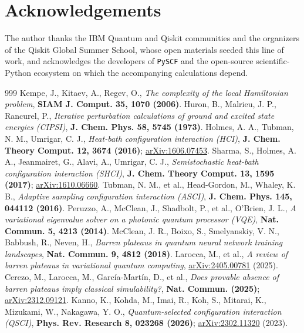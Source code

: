 \documentclass[11pt]{article}
\begin{document}
\section*{Acknowledgements}
\small
The author thanks the IBM Quantum and Qiskit communities and the organizers of the Qiskit Global Summer School,
whose open materials seeded this line of work, and acknowledges the developers of \texttt{PySCF} and the
open-source scientific-Python ecosystem on which the accompanying calculations depend.


\begingroup
\footnotesize
\frenchspacing
\begin{thebibliography}{999}
\setlength{\itemsep}{1.5pt}\setlength{\parsep}{0pt}
 Kempe, J., Kitaev, A., Regev, O., \emph{The complexity of the local Hamiltonian problem}, \textbf{SIAM J. Comput. 35, 1070 (2006)}.
 Huron, B., Malrieu, J. P., Rancurel, P., \emph{Iterative perturbation calculations of ground and excited state energies (CIPSI)}, \textbf{J. Chem. Phys. 58, 5745 (1973)}.
 Holmes, A. A., Tubman, N. M., Umrigar, C. J., \emph{Heat-bath configuration interaction (HCI)}, \textbf{J. Chem. Theory Comput. 12, 3674 (2016)}; \href{https://arxiv.org/abs/1606.07453}{arXiv:1606.07453}.
 Sharma, S., Holmes, A. A., Jeanmairet, G., Alavi, A., Umrigar, C. J., \emph{Semistochastic heat-bath configuration interaction (SHCI)}, \textbf{J. Chem. Theory Comput. 13, 1595 (2017)}; \href{https://arxiv.org/abs/1610.06660}{arXiv:1610.06660}.
 Tubman, N. M., et al., Head-Gordon, M., Whaley, K. B., \emph{Adaptive sampling configuration interaction (ASCI)}, \textbf{J. Chem. Phys. 145, 044112 (2016)}.
 Peruzzo, A., McClean, J., Shadbolt, P., et al., O'Brien, J. L., \emph{A variational eigenvalue solver on a photonic quantum processor (VQE)}, \textbf{Nat. Commun. 5, 4213 (2014)}.
 McClean, J. R., Boixo, S., Smelyanskiy, V. N., Babbush, R., Neven, H., \emph{Barren plateaus in quantum neural network training landscapes}, \textbf{Nat. Commun. 9, 4812 (2018)}.
 Larocca, M., et al., \emph{A review of barren plateaus in variational quantum computing}, \href{https://arxiv.org/abs/2405.00781}{arXiv:2405.00781} (2025).
 Cerezo, M., Larocca, M., García-Martín, D., et al., \emph{Does provable absence of barren plateaus imply classical simulability?}, \textbf{Nat. Commun. (2025)}; \href{https://arxiv.org/abs/2312.09121}{arXiv:2312.09121}.
 Kanno, K., Kohda, M., Imai, R., Koh, S., Mitarai, K., Mizukami, W., Nakagawa, Y. O., \emph{Quantum-selected configuration interaction (QSCI)}, \textbf{Phys. Rev. Research 8, 023268 (2026)}; \href{https://arxiv.org/abs/2302.11320}{arXiv:2302.11320} (2023).

\end{thebibliography}
\end{document}
